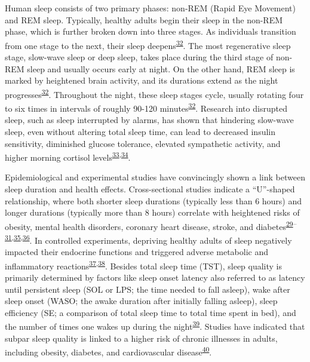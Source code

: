 \documentclass[
  10pt,
]{scrbook}
\begin{document}
Human sleep consists of two primary phases: non-REM (Rapid Eye Movement)
and REM sleep. Typically, healthy adults begin their sleep in the
non-REM phase, which is further broken down into three stages. As
individuals transition from one stage to the next, their sleep
deepens\textsuperscript{\protect\hyperlink{ref-roebuck_2014}{32}}. The
most regenerative sleep stage, slow-wave sleep or deep sleep, takes
place during the third stage of non-REM sleep and usually occurs early
at night. On the other hand, REM sleep is marked by heightened brain
activity, and its durations extend as the night
progresses\textsuperscript{\protect\hyperlink{ref-roebuck_2014}{32}}.
Throughout the night, these sleep stages cycle, usually rotating four to
six times in intervals of roughly 90-120
minutes\textsuperscript{\protect\hyperlink{ref-roebuck_2014}{32}}.
Research into disrupted sleep, such as sleep interrupted by alarms, has
shown that hindering slow-wave sleep, even without altering total sleep
time, can lead to decreased insulin sensitivity, diminished glucose
tolerance, elevated sympathetic activity, and higher morning cortisol
levels\textsuperscript{\protect\hyperlink{ref-stamatakis_2010}{33},\protect\hyperlink{ref-herzog_2013}{34}}.

Epidemiological and experimental studies have convincingly shown a link
between sleep duration and health effects. Cross-sectional studies
indicate a ``U''-shaped relationship, where both shorter sleep durations
(typically less than 6 hours) and longer durations (typically more than
8 hours) correlate with heightened risks of obesity, mental health
disorders, coronary heart disease, stroke, and
diabetes\textsuperscript{\protect\hyperlink{ref-reutrakul_2018}{29}--\protect\hyperlink{ref-jouxe3o_2018}{31},\protect\hyperlink{ref-cappuccio_2011}{35},\protect\hyperlink{ref-cappuccio_2008}{36}}.
In controlled experiments, depriving healthy adults of sleep negatively
impacted their endocrine functions and triggered adverse metabolic and
inflammatory
reactions\textsuperscript{\protect\hyperlink{ref-banks_2007}{37},\protect\hyperlink{ref-vancauter_2008}{38}}.
Besides total sleep time (TST), sleep quality is primarily determined by
factors like sleep onset latency also referred to as latency until
persistent sleep (SOL or LPS; the time needed to fall asleep), wake
after sleep onset (WASO; the awake duration after initially falling
asleep), sleep efficiency (SE; a comparison of total sleep time to total
time spent in bed), and the number of times one wakes up during the
night\textsuperscript{\protect\hyperlink{ref-buysse_2014}{39}}. Studies
have indicated that subpar sleep quality is linked to a higher risk of
chronic illnesses in adults, including obesity, diabetes, and
cardiovascular
disease\textsuperscript{\protect\hyperlink{ref-basnet_2016}{40}}.
\end{document}
